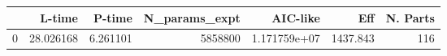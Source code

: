 \begin{tabular}{lrrrrrr}
\toprule
{} &     L-time &    P-time &  N\_params\_expt &      AIC-like &       Eff &  N. Parts \\
\midrule
0 &  28.026168 &  6.261101 &        5858800 &  1.171759e+07 &  1437.843 &       116 \\
\bottomrule
\end{tabular}
